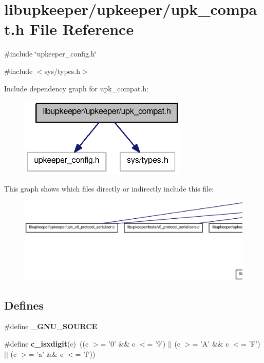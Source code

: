 \section{libupkeeper/upkeeper/upk\_\-compat.h File Reference}
\label{upk__compat_8h}
{\ttfamily \#include \char`\"{}upkeeper\_\-config.h\char`\"{}}\par
{\ttfamily \#include $<$sys/types.h$>$}\par
Include dependency graph for upk\_\-compat.h:\nopagebreak
\begin{figure}[H]
\begin{center}
\leavevmode
\includegraphics[width=227pt]{upk__compat_8h__incl}
\end{center}
\end{figure}
This graph shows which files directly or indirectly include this file:
\nopagebreak
\begin{figure}[H]
\begin{center}
\leavevmode
\includegraphics[width=400pt]{upk__compat_8h__dep__incl}
\end{center}
\end{figure}
\subsection*{Defines}
\begin{DoxyCompactItemize}
\item 
\#define {\bf \_\-GNU\_\-SOURCE}
\item 
\#define {\bf c\_\-isxdigit}(c)~((c $>$= '0' \&\& c $<$= '9') $|$$|$ (c $>$= 'A' \&\& c $<$= 'F') $|$$|$ (c $>$= 'a' \&\& c $<$= 'f'))
\end{DoxyCompactItemize}
